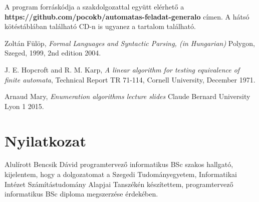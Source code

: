 \documentclass[12pt]{report}
\theoremstyle{definition}
\begin{document}
A program forráskódja a szakdolgozattal együtt elérhető a\\ \textbf{https://github.com/pocokb/automatas-feladat-generalo} címen. A hátsó kötéstáblában található CD-n is ugyanez a tartalom található.

\begin{thebibliography}{9}

Zoltán Fülöp,
\emph{Formal Languages and Syntactic Parsing, (in Hungarian)}
Polygon, Szeged, 1999, 2nd edition 2004.

J. E. Hopcroft and R. M. Karp,
\emph{A linear algorithm for testing equivalence of finite automata},
Technical Report TR 71-114, Cornell University, December 1971.

Arnaud Mary,
\emph{Enumeration algorithms lecture slides}
Claude Bernard University Lyon 1 2015.

\end{thebibliography}

\chapter*{Nyilatkozat}




\noindent
Alulírott Bencsik Dávid programtervező informatikus BSc szakos hallgató, kijelentem, hogy a dolgozatomat a Szegedi Tudományegyetem, Informatikai Intézet Számítástudomány Alapjai Tanszékén készítettem, programtervező informatikus BSc diploma megszerzése érdekében.
\end{document}

